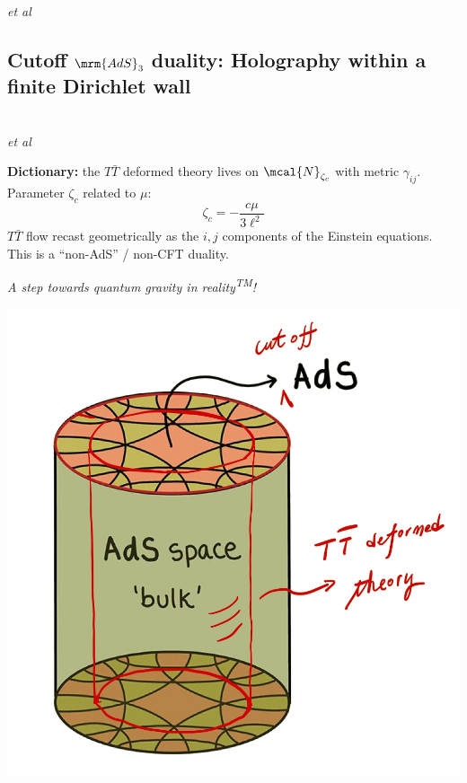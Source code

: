 \documentclass[10pt]{article}
\newcommand{\citations}[1]{{\footnotesize#1\par}}
\newcommand{\reality}{reality\textsuperscript{TM}}
\newcommand{\TTbar}{\texorpdfstring{\ensuremath{T\bar{T}}}{TTbar}\xspace}
\begin{document}
\begin{multicols}{3}
\begin{itemize}
\citations{
\textcite{Zamolodchikov:2004ce}\\
\textcite{Dubovsky:2012wk}\\
\textcite{Dubovsky:2013ira}\\
\textcite{Smirnov:2016lqw}\\
\textcite{Cavaglia:2016oda}\\
\textcite{Dubovsky:2017cnj} \textit{et al}
}

\vspace{-.5\baselineskip}

\end{itemize}

\subsection*{Cutoff $\mrm{AdS}_3$ duality:\texstringonly{\\} Holography within a finite Dirichlet wall}

\citations{
\textcite{McGough:2016lol}\\
\textcite{Kraus:2018xrn} \textit{et al}
}

\textbf{Dictionary:} the \TTbar deformed theory lives on $\mcal{N}_{\zeta_c}$ with metric $\gamma_{ij}$.
Parameter $\zeta_c$ related to $\mu$:
\begin{equation}
	\zeta_c = - \frac{c \mu}{3\ell^2}
	\label{dictionary}
\end{equation}
\TTbar flow recast geometrically as the $i,j$ components of the Einstein equations. This is a ``non-AdS'' / non-CFT duality.

\noindent%
\textit{A step towards quantum gravity in \reality!}

\columnbreak

\vspace*{-4\baselineskip}
\begin{center}
	\hspace{.1\linewidth}
	\includegraphics[width=.45\linewidth]{img/cutoff-ads.jpg}
	

\end{center}
\end{multicols}
\end{document}
